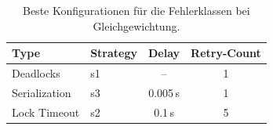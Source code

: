 
\begin{table}[htbp]
	\centering
	\smallsize
	\begin{tabular}{l|lcc}
		\toprule
		Type & Strategy & Delay & Retry-Count \\
		\midrule
		Deadlocks     & s1 & -- & 1 \\
		Serialization & s3 & 0.005\,s & 1 \\
		Lock Timeout  & s2 & 0.1\,s & 5 \\
		\bottomrule
	\end{tabular}
	\caption{Beste Konfigurationen für die Fehlerklassen bei Gleichgewichtung.}
	\label{tab:bestConfig}
\end{table}